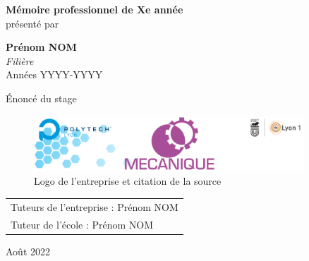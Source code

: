 \documentclass[a4paper,11pt]{report}    %
\begin{document}

\hypersetup{pageanchor=false}
\begin{titlepage}
    \begin{center}
        \vspace*{0.5cm}

        \Huge
        \textbf{Mémoire professionnel de Xe année}\\
        \Large
        présenté par\\

        \vfill

        \Large
        \textbf{Prénom NOM}\\
        \emph{Filière}\\
        Années YYYY-YYYY

        \vfill

        \Huge
        Énoncé du stage\\

        \vfill

        \begin{figure}[H]
          \centering
          \caption*{\Large Logo de l'entreprise et citation de la source}
          \label{fig:Banniere_Meca}
          \includegraphics[width=0.9\textwidth]{Images/Banniere_Meca.png}
        \end{figure}

        \vfill

        \Large
        \begin{flushleft}
            \begin{tabular}{l}
                Tuteurs de l'entreprise : Prénom NOM\\
                Tuteur de l'école : Prénom NOM
            \end{tabular}
        \end{flushleft}

        \begin{flushright}
          Août 2022
        \end{flushright}


\end{center}
\end{titlepage}
\end{document}
